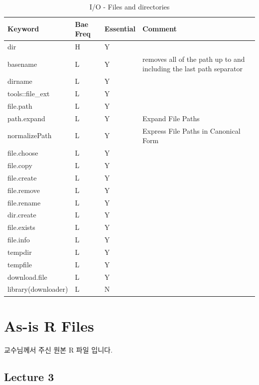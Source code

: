 \documentclass[11pt,]{krantz}
\theoremstyle{definition}
\theoremstyle{definition}
\theoremstyle{remark}
\begin{document}
\begin{table}

\caption{\label{tab:knitchunk26}I/O - Files and directories }
\centering
\begin{tabular}[t]{llll}
\toprule
Keyword & Bae Freq & Essential & Comment\\
\midrule
dir & H & Y & \\
basename & L & Y & removes all of the path up to and including the last path separator\\
dirname & L & Y & \\
tools::file\_ext & L & Y & \\
file.path & L & Y & \\
\addlinespace
path.expand & L & Y & Expand File Paths\\
normalizePath & L & Y & Express File Paths in Canonical Form\\
file.choose & L & Y & \\
file.copy & L & Y & \\
file.create & L & Y & \\
\addlinespace
file.remove & L & Y & \\
file.rename & L & Y & \\
dir.create & L & Y & \\
file.exists & L & Y & \\
file.info & L & Y & \\
\addlinespace
tempdir & L & Y & \\
tempfile & L & Y & \\
download.file & L & Y & \\
library(downloader) & L & N & \\
\bottomrule
\end{tabular}
\end{table}

\cleardoublepage 

\appendix {}


\chapter{As-is R Files}\label{as-is-r-files}

교수님께서 주신 원본 R 파일 입니다.

\section{Lecture 3}\label{lecture-3}
\end{document}
